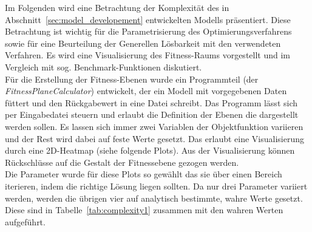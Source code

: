 %
Im Folgenden wird eine Betrachtung der Komplexität des in Abschnitt~\ref{sec:model_developement} entwickelten Modells präsentiert. Diese Betrachtung ist wichtig für die Parametrisierung des Optimierungsverfahrens sowie für eine Beurteilung der Generellen Lösbarkeit mit den verwendeten Verfahren. Es wird eine Visualisierung des Fitness-Raums vorgestellt und im Vergleich mit sog. Benchmark-Funktionen diskutiert.\\
%

Für die Erstellung der Fitness-Ebenen wurde ein Programmteil (der \textit{FitnessPlaneCalculator}) entwickelt, der ein Modell mit vorgegebenen Daten füttert und den Rückgabewert in eine Datei schreibt. Das Programm lässt sich per Eingabedatei steuern und erlaubt die Definition der Ebenen die dargestellt werden sollen. Es lassen sich immer zwei Variablen der Objektfunktion variieren und der Rest wird dabei auf feste Werte gesetzt. Das erlaubt eine Visualisierung durch eine 2D-Heatmap (siehe folgende Plots). Aus der Visualisierung können Rückschlüsse auf die Gestalt der Fitnessebene gezogen werden.\\
%

Die Parameter wurde für diese Plots so gewählt das sie über einen Bereich iterieren, indem die richtige Lösung liegen sollten. Da nur drei Parameter variiert werden, werden die übrigen vier auf analytisch bestimmte, wahre Werte gesetzt. Diese sind in Tabelle~\ref{tab:complexity1} zusammen mit den wahren Werten aufgeführt.\\

